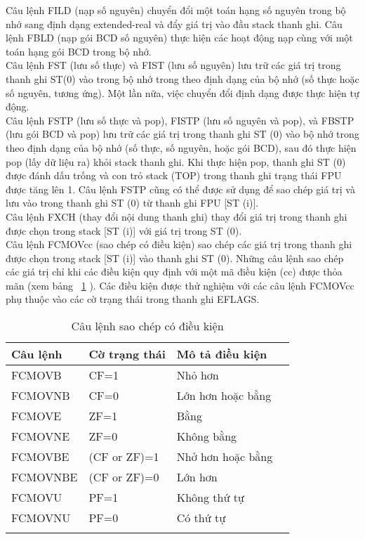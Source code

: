 		Câu lệnh FILD (nạp số nguyên) chuyển đổi một toán hạng số nguyên trong bộ nhớ sang định dạng extended-real và đẩy giá trị vào đầu stack thanh ghi. Câu lệnh FBLD (nạp gói BCD số nguyên)  thực hiện các hoạt động nạp cùng với một toán hạng gói BCD trong bộ nhớ.\\
		
		Câu lệnh FST (lưu số thực) và FIST (lưu số nguyên) lưu trữ các giá trị trong thanh ghi ST(0) vào trong bộ nhớ trong theo định dạng của bộ nhớ (số thực hoặc số nguyên, tương ứng). Một lần nữa, việc chuyển đổi định dạng được thực hiện tự động.\\
		
		Câu lệnh FSTP (lưu số thực và pop), FISTP (lưu số nguyên và pop), và FBSTP (lưu gói BCD và pop) lưu trữ các giá trị trong thanh ghi ST (0) vào bộ nhớ trong theo định dạng của bộ nhớ (số thực, số nguyên, hoặc gói BCD), sau đó thực hiện pop (lấy dữ liệu ra) khỏi stack thanh ghi. Khi thực hiện pop, thanh ghi ST (0) được đánh dấu trống và con trỏ stack (TOP) trong thanh ghi trạng thái FPU được tăng lên 1. Câu lệnh FSTP cũng có thể được sử dụng để sao chép giá trị và lưu vào trong thanh ghi ST (0) từ thanh ghi FPU [ST (i)].\\
		
		Câu lệnh FXCH (thay đổi nội dung thanh ghi) thay đổi giá trị trong thanh ghi được chọn trong stack [ST (i)] với giá trị trong ST (0).\\
		
		Câu lệnh FCMOVcc (sao chép có điều kiện) sao chép các giá trị trong thanh ghi được chọn trong stack [ST (i)] vào thanh ghi ST (0). Những câu lệnh sao chép các giá trị chỉ khi các điều kiện quy định với một mã điều kiện (cc) được thỏa mãn (xem bảng ~\ref{tb:MoveIns} ). Các điều kiện được thử nghiệm với các câu lệnh FCMOVcc phụ thuộc vào các cờ trạng thái trong thanh ghi EFLAGS.
	\begin{longtable}{|l|l|l|l|}
			\hline
				Câu lệnh & Cờ trạng thái & Mô tả điều kiện \\
			\hline
			\hline
				FCMOVB & CF=1 & Nhỏ hơn \\
				FCMOVNB & CF=0 &  Lớn hơn hoặc bằng\\
				FCMOVE & ZF=1 & Bằng\\
				FCMOVNE & ZF=0 & Không bằng\\
				FCMOVBE & (CF or ZF)=1 & Nhở hơn hoặc bằng\\
				FCMOVNBE & (CF or ZF)=0 & Lớn hơn \\
				FCMOVU & PF=1 &  Không thứ tự \\
				FCMOVNU& PF=0 & Có thứ tự\\
			\hline
				\caption{Câu lệnh sao chép có điều kiện}
				\label{tb:MoveIns}
		\end{longtable}		
		

